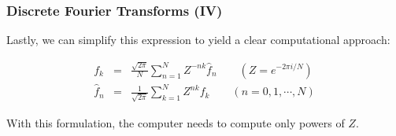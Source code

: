 \documentclass[hyperref={colorlinks=true}]{beamer}
\begin{document}

\begin{frame}%
  \frametitle{Discrete Fourier Transforms (IV)}

  Lastly, we can simplify this expression to yield a clear computational approach:
      
  \begin{eqnarray}
    f_k       &=& \frac{\sqrt{2\pi}}{N} \sum_{n=1}^{N} Z^{-nk}\hat{f}_{n} \qquad (Z=e^{-2\pi i/N}) \\
    \hat{f}_n &=& \frac{1}{\sqrt{2\pi}} \sum_{k=1}^{N} Z^{nk} f_k \qquad (n=0,1,\cdots,N) 
  \end{eqnarray}
  
  With this formulation, the computer needs to compute only powers of $Z$.
  
\end{frame}

\end{document}
